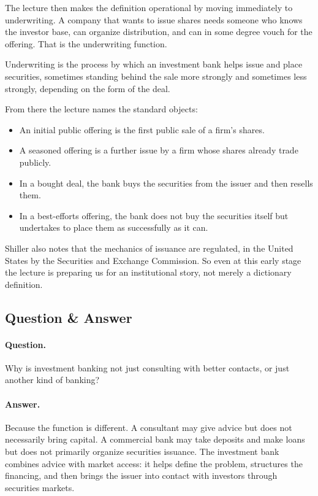 The lecture then makes the definition operational by moving immediately to underwriting. A company that wants to issue shares needs someone who knows the investor base, can organize distribution, and can in some degree vouch for the offering. That is the underwriting function.

\begin{definition}
Underwriting is the process by which an investment bank helps issue and place securities, sometimes standing behind the sale more strongly and sometimes less strongly, depending on the form of the deal.
\end{definition}

From there the lecture names the standard objects:

\begin{itemize}
\item An initial public offering is the first public sale of a firm's shares.
\item A seasoned offering is a further issue by a firm whose shares already trade publicly.
\item In a bought deal, the bank buys the securities from the issuer and then resells them.
\item In a best-efforts offering, the bank does not buy the securities itself but undertakes to place them as successfully as it can.
\end{itemize}

Shiller also notes that the mechanics of issuance are regulated, in the United States by the Securities and Exchange Commission. So even at this early stage the lecture is preparing us for an institutional story, not merely a dictionary definition.

\subsection{Question \& Answer}

\paragraph{Question.} Why is investment banking not just consulting with better contacts, or just another kind of banking?

\paragraph{Answer.} Because the function is different. A consultant may give advice but does not necessarily bring capital. A commercial bank may take deposits and make loans but does not primarily organize securities issuance. The investment bank combines advice with market access: it helps define the problem, structures the financing, and then brings the issuer into contact with investors through securities markets.

